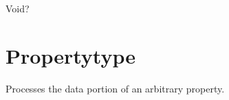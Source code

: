 \documentclass[letterpaper,12pt,english,openany,oneside]{sphinxmanual}
\begin{document}
\begin{sphinxVerbatim}[commandchars=\\\{\}]
Void?
\end{sphinxVerbatim}


\section{Property\sphinxhyphen{}type}
\label{\detokenize{SaveAsXML_DirectivesRef:property-type}}
Processes the data portion of an arbitrary property.

\label{\detokenize{SaveAsXML_DirectivesRef:dtd-content-rule-27}}

\begin{sphinxVerbatim}[commandchars=\\\{\}]
         
         
  
\end{sphinxVerbatim}
\label{\detokenize{SaveAsXML_DirectivesRef:attributes-20}}
\end{document}
